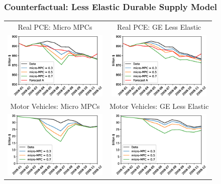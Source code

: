 \documentclass[english,xcolor=svgnames]{beamer}
\begin{document}
\begin{frame}[label=durablepriceforecasts]
\frametitle{Counterfactual: Less Elastic Durable Supply Model}

\begin{center}
\footnotesize
\centering
    \begin{tabular}{cc}
    Real PCE: Micro MPCs & Real PCE: GE Less Elastic \\
    \includegraphics[width=5cm]{figures/Real_PCEfc_micro_durableprice.eps} &   \includegraphics[width=5cm]{figures/Real_PCEfc_GE_durableprice.eps} \\
    Motor Vehicles: Micro MPCs & Motor Vehicles: GE Less Elastic \\
    \includegraphics[width=5cm]{figures/Real_Motorvehicles_micro_durableprice.eps} &  \includegraphics[width=5cm]{figures/Real_Motorvehicles_GE_durableprice.eps} \\
    \end{tabular} \\
 \end{center} 
 \vspace{-0.5cm}
\end{frame}
\end{document}
